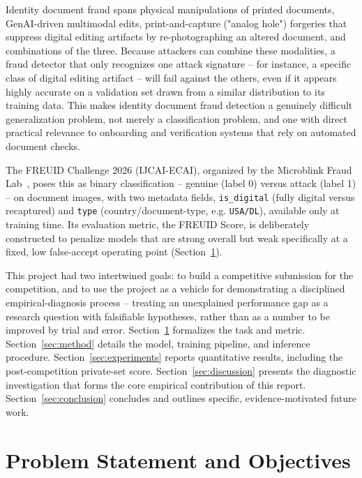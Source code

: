 \documentclass{article}
\begin{document}
Identity document fraud spans physical manipulations of printed documents,
GenAI-driven multimodal edits, print-and-capture ("analog hole") forgeries
that suppress digital editing artifacts by re-photographing an altered
document, and combinations of the three. Because attackers can combine
these modalities, a fraud detector that only recognizes one attack
signature -- for instance, a specific class of digital editing artifact --
will fail against the others, even if it appears highly accurate on a
validation set drawn from a similar distribution to its training data. This
makes identity document fraud detection a genuinely difficult
generalization problem, not merely a classification problem, and one with
direct practical relevance to onboarding and verification systems that rely
on automated document checks.

The FREUID Challenge 2026 (IJCAI-ECAI), organized by the Microblink Fraud
Lab~\cite{freuid2026}, poses this as binary classification -- genuine
(label 0) versus attack (label 1) -- on document images, with two metadata
fields, \texttt{is\_digital} (fully digital versus recaptured) and
\texttt{type} (country/document-type, e.g. \texttt{USA/DL}), available only
at training time. Its evaluation metric, the FREUID Score, is deliberately
constructed to penalize models that are strong overall but weak specifically
at a fixed, low false-accept operating point (Section~\ref{sec:problem}).

This project had two intertwined goals: to build a competitive submission
for the competition, and to use the project as a vehicle for demonstrating
a disciplined empirical-diagnosis process -- treating an unexplained
performance gap as a research question with falsifiable hypotheses, rather
than as a number to be improved by trial and error. Section~\ref{sec:problem}
formalizes the task and metric. Section~\ref{sec:method} details the model,
training pipeline, and inference procedure. Section~\ref{sec:experiments}
reports quantitative results, including the post-competition private-set
score. Section~\ref{sec:discussion} presents the diagnostic investigation
that forms the core empirical contribution of this report. Section~\ref{sec:conclusion}
concludes and outlines specific, evidence-motivated future work.

\section{Problem Statement and Objectives}
\label{sec:problem}
\end{document}
